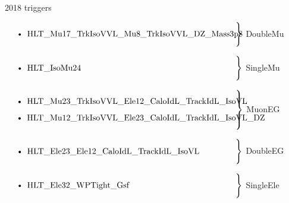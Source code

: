 \documentclass[9pt]{beamer}
\begin{document}
\begin{frame}{2018 triggers}
\justifying

$\left. \text{\parbox{0.8\linewidth}{
\begin{itemize}
\item HLT\_Mu17\_TrkIsoVVL\_Mu8\_TrkIsoVVL\_DZ\_Mass3p8
\end{itemize}
}} \right \}$ \alert{DoubleMu} \vfill

$\left. \text{\parbox{0.8\linewidth}{
\begin{itemize}
\item HLT\_IsoMu24
\end{itemize}
}} \right \}$ \alert{SingleMu} \vfill

$\left. \text{\parbox{0.8\linewidth}{
\begin{itemize}
\item HLT\_Mu23\_TrkIsoVVL\_Ele12\_CaloIdL\_TrackIdL\_IsoVL
\item HLT\_Mu12\_TrkIsoVVL\_Ele23\_CaloIdL\_TrackIdL\_IsoVL\_DZ
\end{itemize}
}} \right \}$ \alert{MuonEG} \vfill

$\left. \text{\parbox{0.8\linewidth}{
\begin{itemize}
\item HLT\_Ele23\_Ele12\_CaloIdL\_TrackIdL\_IsoVL
\end{itemize}
}} \right \}$ \alert{DoubleEG} \vfill

$\left. \text{\parbox{0.8\linewidth}{
\begin{itemize}
\item HLT\_Ele32\_WPTight\_Gsf
\end{itemize}
}} \right \}$ \alert{SingleEle} \vfill
\end{frame}
\end{document}
